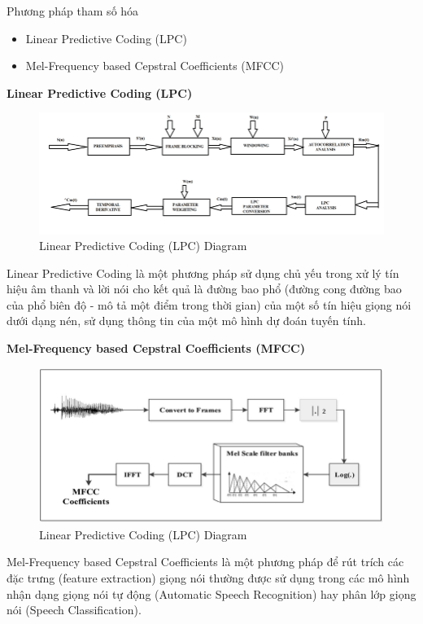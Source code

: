 \documentclass{article}
\begin{document}
	Phương pháp tham số hóa
	\begin{itemize}
		\item Linear Predictive Coding (LPC) 
		\item Mel-Frequency based Cepstral Coefficients (MFCC)
	\end{itemize}
	\textbf{Linear Predictive Coding (LPC)}
	\begin{figure}[H]
		\centering
		\includegraphics[width=1\linewidth]{images/Block-diagram-of-LPC-Linear-Predictive-Coding.png}
		\caption{Linear Predictive Coding (LPC) Diagram}
		\label{fig:writing-thesis}
	\end{figure}

	Linear Predictive Coding là một phương pháp sử dụng chủ yếu trong xử lý tín hiệu âm thanh và lời nói cho kết quả là đường bao phổ (đường cong đường bao của phổ biên độ - mô tả một điểm trong thời gian) của một số tín hiệu giọng nói dưới dạng nén, sử dụng thông tin của một mô hình dự đoán tuyến tính.

	\textbf{Mel-Frequency based Cepstral Coefficients (MFCC)}
	\begin{figure}[H]
		\centering
		\includegraphics[width=1\linewidth]{images/Extraction-Mel-frequency-cepstral-coefficients-MFCC-from-the-audio-recording-signals.png}
		\caption{Linear Predictive Coding (LPC) Diagram}
		\label{fig:writing-thesis}
	\end{figure}

	Mel-Frequency based Cepstral Coefficients là một phương pháp để rút trích các đặc trưng (feature extraction) giọng nói thường được sử dụng trong các mô hình nhận dạng giọng nói tự động (Automatic Speech Recognition) hay phân lớp giọng nói (Speech Classification).
\end{document}
